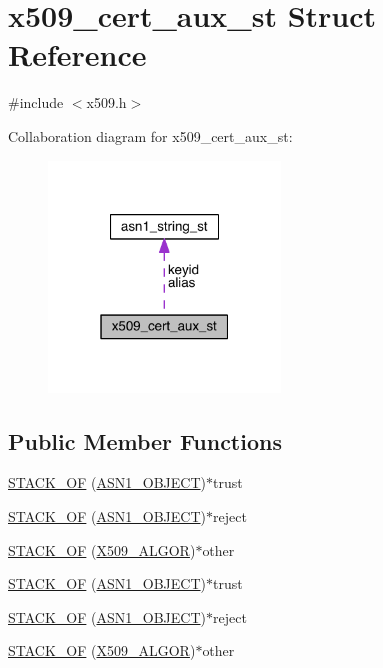 \hypertarget{structx509__cert__aux__st}{}\section{x509\+\_\+cert\+\_\+aux\+\_\+st Struct Reference}
\label{structx509__cert__aux__st}


{\ttfamily \#include $<$x509.\+h$>$}



Collaboration diagram for x509\+\_\+cert\+\_\+aux\+\_\+st\+:\nopagebreak
\begin{figure}[H]
\begin{center}
\leavevmode
\includegraphics[width=175pt]{structx509__cert__aux__st__coll__graph}
\end{center}
\end{figure}
\subsection*{Public Member Functions}
\begin{DoxyCompactItemize}
\item 
\hyperlink{structx509__cert__aux__st_a65a48ea23747b7bf413a509ba3a7660f}{S\+T\+A\+C\+K\+\_\+\+OF} (\hyperlink{crypto_2ossl__typ_8h_ae3fda0801e4c8e250087052bafb3ce2e}{A\+S\+N1\+\_\+\+O\+B\+J\+E\+CT})$\ast$trust
\item 
\hyperlink{structx509__cert__aux__st_a740f146867e574f1b4ea4136cc8a2067}{S\+T\+A\+C\+K\+\_\+\+OF} (\hyperlink{crypto_2ossl__typ_8h_ae3fda0801e4c8e250087052bafb3ce2e}{A\+S\+N1\+\_\+\+O\+B\+J\+E\+CT})$\ast$reject
\item 
\hyperlink{structx509__cert__aux__st_a83bc3112707f19f3256b76ec1cf18955}{S\+T\+A\+C\+K\+\_\+\+OF} (\hyperlink{crypto_2ossl__typ_8h_aa2b6185e6254f36f709cd6577fb5022e}{X509\+\_\+\+A\+L\+G\+OR})$\ast$other
\item 
\hyperlink{structx509__cert__aux__st_a65a48ea23747b7bf413a509ba3a7660f}{S\+T\+A\+C\+K\+\_\+\+OF} (\hyperlink{crypto_2ossl__typ_8h_ae3fda0801e4c8e250087052bafb3ce2e}{A\+S\+N1\+\_\+\+O\+B\+J\+E\+CT})$\ast$trust
\item 
\hyperlink{structx509__cert__aux__st_a740f146867e574f1b4ea4136cc8a2067}{S\+T\+A\+C\+K\+\_\+\+OF} (\hyperlink{crypto_2ossl__typ_8h_ae3fda0801e4c8e250087052bafb3ce2e}{A\+S\+N1\+\_\+\+O\+B\+J\+E\+CT})$\ast$reject
\item 
\hyperlink{structx509__cert__aux__st_a83bc3112707f19f3256b76ec1cf18955}{S\+T\+A\+C\+K\+\_\+\+OF} (\hyperlink{crypto_2ossl__typ_8h_aa2b6185e6254f36f709cd6577fb5022e}{X509\+\_\+\+A\+L\+G\+OR})$\ast$other
\end{DoxyCompactItemize}
